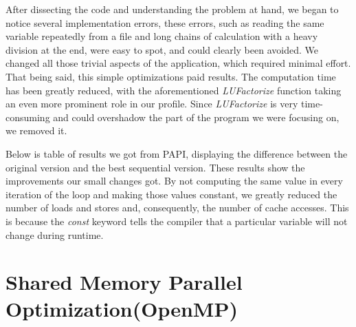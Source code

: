 \documentclass[a4paper,10pt,openright,openbib,twocolumn]{article}
\begin{document}
After dissecting the code and understanding the problem at hand, we began to notice several implementation errors, these errors, such as reading the same variable repeatedly from a file and long chains of calculation with a heavy division at the end, were easy to spot, and could clearly been avoided. We changed all those trivial aspects of the application, which required minimal effort. That being said, this simple optimizations paid results. The computation time has been greatly reduced, with the aforementioned \emph{LUFactorize} function taking an even more prominent role in our profile. Since \emph{LUFactorize} is very time-consuming and could overshadow the part of the program we were focusing on, we removed it.

Below is table of results we got from PAPI, displaying the difference between the original version and the best sequential version. 
These results show the improvements our small changes got. By not computing the same value in every iteration of the loop and making those values constant, we greatly reduced the number of loads and stores and, consequently, the number of cache accesses. This is because the \emph{const} keyword tells the compiler that a particular variable will not change during runtime.  

\begin{table}[!htb]
    \caption{PAPI comparison}
    \label{tab:testcases}
\end{table}

\section{Shared Memory Parallel Optimization(OpenMP)}
\label{openmp}
\end{document}
